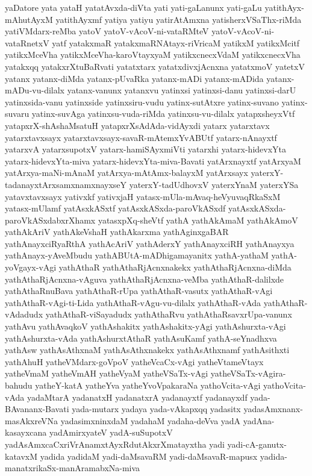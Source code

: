 {yaDatore
yata
yataH
yatatAvxda-diVta
yati
yati-gaLanunx
yati-gaLu
yatithAyx-mAhutAyxM
yatithAyxmf
yatiya
yatiyu
yatirAtAmxna
yatisherxVSaThx-riMda
yatiVMdarx-reMba
yatoV
yatoV-vAcoV-ni-vataRMteV
yatoV-vAcoV-ni-vataRnetxV
yatf
yatakxmaR
yatakxmaRNAtayx-riVricaM
yatikxM
yatikxMcitf
yatikxMceVha
yatikxMceVha-karoVtayxyaM
yatikxcnecxVdaM
yatikxcnecxVha
yatakxqq
yatakxrXtuBaRvati
yatatxtarx
yatatxdivxjAcnxna
yatatxmoV
yatetxV
yatanx
yatanx-diMda
yatanx-pUvaRka
yatanx-mADi
yatanx-mADida
yatanx-mADu-vu-dilalx
yatanx-vanunx
yatanxvu
yatinxsi
yatinxsi-danu
yatinxsi-darU
yatinxsida-vanu
yatinxside
yatinxsiru-vudu
yatinx-sutAtxre
yatinx-suvano
yatinx-suvaru
yatinx-suvAga
yatinxsu-vuda-riMda
yatinxsu-vu-dilalx
yatapxsheyxVtf
yatapxrX-shAshaMsatuH
yatapxrXsAdAda-vidAyxdi
yatarx
yatarxtavx
yatarxtavxsayx
yatarxtavxsayx-savaR-mAtemxYvABUtf
yatarx-nAnayxtf
yatarxvA
yatarxsupotxV
yatarx-hamiSAyxmiVti
yatarxhi
yatarx-hidevxYta
yatarx-hidevxYta-miva
yatarx-hidevxYta-miva-Bavati
yatArxnayxtf
yatArxyaM
yatArxya-maNi-mAnaM
yatArxya-mAtAmx-balayxM
yatArxsayx
yaterxY-tadanayxtArxsamxnamxnayxseY
yaterxY-tadUdhovxV
yaterxYnaM
yaterxYSa
yatavxtavxsayx
yativxkf
yativxjaH
yatasx-mUla-mAvaq-heVyuvaqRkaSxM
yatasx-mUlamf
yatAsxkASxtf
yatAsxkASxda-paroVkASxdf
yatAsxkASxda-paroVkASxdabxrXhamx
yatasxpXq-sheVtf
yathA
yathAkAmaM
yathAkAmoV
yathAkAriV
yathAkeVshaH
yathAkarxma
yathAginxgaBAR
yathAnayxciRyaRthA
yathAcAriV
yathAderxY
yathAnayxciRH
yathAnayxya
yathAnayx-yAveMbudu
yathABUtA-mADhigamayanitx
yathA-yathaM
yathA-yoVgayx-vAgi
yathAthaR
yathAthaRjAcnxnakekx
yathAthaRjAcnxna-diMda
yathAthaRjAcnxna-vAguva
yathAthaRjAcnxna-veMba
yathAthaR-dalilxde
yathAthaRnuBava
yathAthaR-rUpa
yathAthaR-vasutx
yathAthaR-vAgi
yathAthaR-vAgi-ti-Lida
yathAthaR-vAgu-vu-dilalx
yathAthaR-vAda
yathAthaR-vAdadudx
yathAthaR-viSayadudx
yathAthaRvu
yathAthaRsavxrUpa-vanunx
yathAvu
yathAvaqkoV
yathAshakitx
yathAshakitx-yAgi
yathAshurxta-vAgi
yathAshurxta-vAda
yathAshurxtAthaR
yathAsuKamf
yathA-seYnadhxva
yathAsw
yathAsAthxnaM
yathAsAthxnakekx
yathAsAthxnamf
yathAsithxti
yathAhuH
yatheVMdarx-goVpoV
yatheVcaCx-vAgi
yatheVtameVtayx
yatheVmaM
yatheVmAH
yatheVyaM
yatheVSaTx-vAgi
yatheVSaTx-vAgira-bahudu
yatheY-katA
yatheYva
yatheYvoVpakaraNa
yathoVcita-vAgi
yathoVcita-vAda
yadaMtarA
yadanatxH
yadanatxrA
yadanayxtf
yadanayxdf
yada-BAvananx-Bavati
yada-mutarx
yadaya
yada-vAkapxqq
yadasitx
yadasAmxnanx-masAkxreVNa
yadasimxninxdaM
yadahaM
yadaha-deVva
yadA
yadAna-kasayxcana
yadAmirxyateV
yadA-suSupotxV
yadAsAmxcaCxriVrAnamxtAyxRdutAkxrXmatayxtha
yadi
yadi-cA-ganutx-katavxM
yadida
yadidaM
yadi-daMsavaRM
yadi-daMsavaR-mapusx
yadida-manatxrikaSx-manAramabxNa-miva
}
